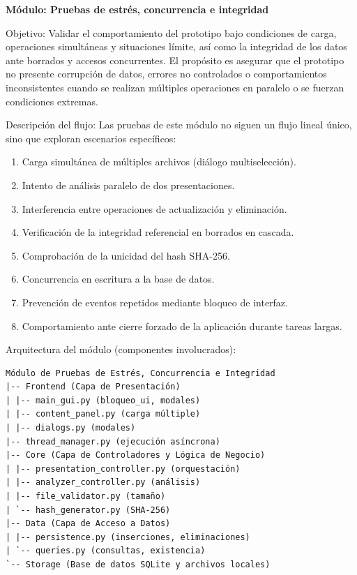 \documentclass[11pt]{article}
\begin{document}
\clearpage
\textbf{Módulo: Pruebas de estrés, concurrencia e integridad}

Objetivo: Validar el comportamiento del prototipo bajo condiciones de carga, operaciones simultáneas y situaciones límite, así como la integridad de los datos ante borrados y accesos concurrentes. El propósito es asegurar que el prototipo no presente corrupción de datos, errores no controlados o comportamientos inconsistentes cuando se realizan múltiples operaciones en paralelo o se fuerzan condiciones extremas.

Descripción del flujo:
Las pruebas de este módulo no siguen un flujo lineal único, sino que exploran escenarios específicos:

\begin{enumerate}
\item Carga simultánea de múltiples archivos (diálogo multiselección).
\item Intento de análisis paralelo de dos presentaciones.
\item Interferencia entre operaciones de actualización y eliminación.
\item Verificación de la integridad referencial en borrados en cascada.
\item Comprobación de la unicidad del hash SHA-256.
\item Concurrencia en escritura a la base de datos.
\item Prevención de eventos repetidos mediante bloqueo de interfaz.
\item Comportamiento ante cierre forzado de la aplicación durante tareas largas.
\end{enumerate}

Arquitectura del módulo (componentes involucrados):

\begin{verbatim}
Módulo de Pruebas de Estrés, Concurrencia e Integridad
|-- Frontend (Capa de Presentación)
| |-- main_gui.py (bloqueo_ui, modales)
| |-- content_panel.py (carga múltiple)
| |-- dialogs.py (modales)
|-- thread_manager.py (ejecución asíncrona)
|-- Core (Capa de Controladores y Lógica de Negocio)
| |-- presentation_controller.py (orquestación)
| |-- analyzer_controller.py (análisis)
| |-- file_validator.py (tamaño)
| `-- hash_generator.py (SHA-256)
|-- Data (Capa de Acceso a Datos)
| |-- persistence.py (inserciones, eliminaciones)
| `-- queries.py (consultas, existencia)
`-- Storage (Base de datos SQLite y archivos locales)
\end{verbatim}
\end{document}
